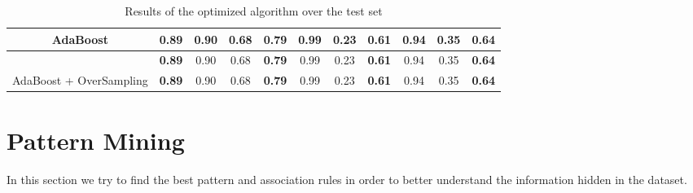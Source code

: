 \documentclass{article}
\begin{document}
\begin{table}[]
\begin{tabular}{c|c|c|c|c|c|c|c|c|c|c|}
			\multicolumn{1}{|c|}{AdaBoost}                                              & \textbf{0.89}                                                                      & 0.90                                             & 0.68                                             & \textbf{0.79}                                               & 0.99                                             & 0.23                                             & \textbf{0.61}                                               & 0.94                                             & 0.35                                             & \textbf{0.64}                                               \\ \hline
			\rowcolor[HTML]{E6E6E6} 
			\multicolumn{1}{|c|}{\cellcolor[HTML]{E6E6E6}AdaBoost + OverSampling}       & \textbf{0.89}                                                                      & 0.90                                             & 0.68                                             & \textbf{0.79}                                               & 0.99                                             & 0.23                                             & \textbf{0.61}                                               & 0.94                                             & 0.35                                             & \textbf{0.64}                                               \\ \hline
			\multicolumn{1}{|c|}{AdaBoost + OverSampling}                               & \textbf{0.89}                                                                      & 0.90                                             & 0.68                                             & \textbf{0.79}                                               & 0.99                                             & 0.23                                             & \textbf{0.61}                                               & 0.94                                             & 0.35                                             & \textbf{0.64}                                               \\ \hline
		\end{tabular}
		\caption{Results of the optimized algorithm over the test set}
		\label{tab:restest}
	\end{table}
	
	
	
	\section{Pattern Mining}
	\label{sec:patternmining}
	In this section we try to find the best pattern and association rules in order to better understand the information hidden in the dataset. 
	
\end{document}

